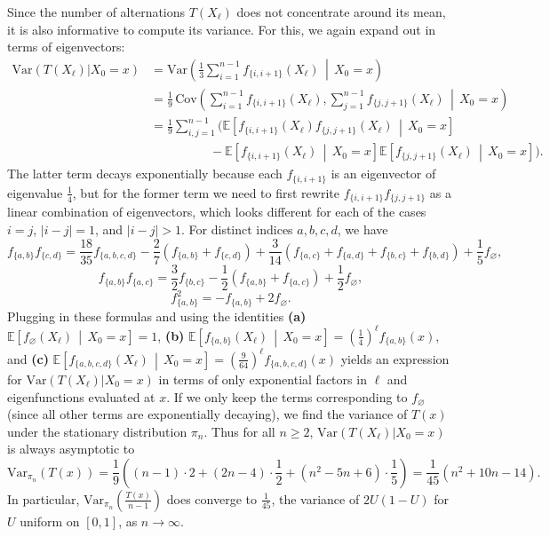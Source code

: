 \documentclass[11pt]{article}
\newcounter{r}
\newcounter{s}
\numberwithin{equation}{section}
\begin{document}
Since the number of alternations $T(X_\ell)$ does not concentrate around its mean, it is also informative to compute its variance. For this, we again expand out in terms of eigenvectors:
\begin{align*}
    \text{Var}(T(X_\ell) | X_0 = x) &= \text{Var}\left(\frac{1}{3} \sum_{i=1}^{n-1} f_{\{i, i+1\}}(X_\ell) \,\middle|\, X_0 = x\right) \\
    &= \frac{1}{9}\, \text{Cov}\left(\sum_{i=1}^{n-1}f_{\{i, i+1\}}(X_\ell), \sum_{j=1}^{n-1}f_{\{j, j+1\}}(X_\ell) \,\middle|\, X_0 = x\right) \\
    &= \frac{1}{9}\sum_{i,j = 1}^{n-1} \Bigg(\mathbb{E}\left[f_{\{i, i+1\}}(X_\ell)f_{\{j, j+1\}}(X_\ell) \,\middle|\, X_0 = x \right] \\
    &\hspace{2cm}- \mathbb{E}\left[f_{\{i, i+1\}}(X_\ell) \,\middle|\, X_0 = x \right]\mathbb{E}\left[f_{\{j, j+1\}}(X_\ell) \,\middle|\, X_0 = x \right]\Bigg).
\end{align*}
The latter term decays exponentially because each $f_{\{i, i+1\}}$ is an eigenvector of eigenvalue $\frac{1}{4}$, but for the former term we need to first rewrite $f_{\{i, i+1\}} f_{\{j, j+1\}}$ as a linear combination of eigenvectors, which looks different for each of the cases $i=j$, $|i-j| = 1$, and $|i-j| > 1$. For distinct indices $a, b, c, d$, we have
\[
    f_{\{a,b\}} f_{\{c, d\}} = \frac{18}{35} f_{\{a,b,c,d\}} - \frac{2}{7} (f_{\{a, b\}} + f_{\{c, d\}}) + \frac{3}{14} (f_{\{a,c\}} + f_{\{a,d\}} + f_{\{b,c\}} + f_{\{b,d\}}) + \frac{1}{5} f_{\varnothing},
\]
\[
    f_{\{a, b\}} f_{\{a, c\}} = \frac{3}{2} f_{\{b, c\}} - \frac{1}{2} (f_{\{a, b\}} + f_{\{a, c\}}) + \frac{1}{2} f_{\varnothing},
\]
\[
    f_{\{a, b\}}^2 = -f_{\{a, b\}} +2 f_{\varnothing}.
\]
Plugging in these formulas and using the identities \textbf{(a)} $\mathbb{E}\left[f_{\varnothing}(X_\ell) \,\middle|\, X_0 = x \right] = 1$, \textbf{(b)} $\mathbb{E}\left[f_{\{a, b\}}(X_\ell) \,\middle|\, X_0 = x \right] = \left(\frac{1}{4}\right)^\ell f_{\{a, b\}}(x)$, and \textbf{(c)} $\mathbb{E}\left[f_{\{a, b, c, d\}}(X_\ell) \,\middle|\, X_0 = x \right] = \left(\frac{9}{64}\right)^\ell f_{\{a, b, c, d\}}(x)$ yields an expression for $\text{Var}(T(X_\ell) | X_0 = x)$ in terms of only exponential factors in $\ell$ and eigenfunctions evaluated at $x$. If we only keep the terms corresponding to $f_{\varnothing}$ (since all other terms are exponentially decaying), we find the variance of $T(x)$ under the stationary distribution $\pi_n$. Thus for all $n \ge 2$, $\text{Var}(T(X_\ell) | X_0 = x)$ is always asymptotic to
\[
    \text{Var}_{\pi_n}(T(x)) = \frac{1}{9}\left((n-1) \cdot 2 + (2n-4) \cdot \frac{1}{2} + (n^2 - 5n + 6) \cdot \frac{1}{5} \right) = \frac{1}{45}(n^2 + 10n - 14).
\]
In particular, $\text{Var}_{\pi_n}\left(\frac{T(x)}{n-1}\right)$ does converge to $\frac{1}{45}$, the variance of $2U(1-U)$ for $U$ uniform on $[0, 1]$, as $n \to \infty$.
\end{document}
